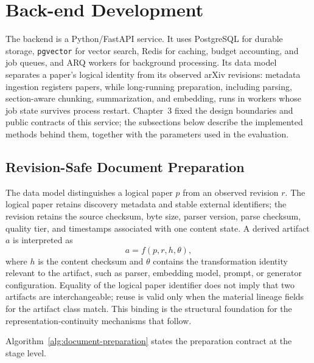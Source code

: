 \FloatBarrier

\section{Back-end Development}

The backend is a Python/FastAPI service.
It uses PostgreSQL for durable storage, \texttt{pgvector} for vector search, Redis for caching, budget accounting, and job queues, and ARQ workers for background processing.
Its data model separates a paper's logical identity from its observed arXiv revisions: metadata ingestion registers papers, while long-running preparation, including parsing, section-aware chunking, summarization, and embedding, runs in workers whose job state survives process restart.
Chapter~3 fixed the design boundaries and public contracts of this service; the subsections below describe the implemented methods behind them, together with the parameters used in the evaluation.

\subsection{Revision-Safe Document Preparation}
\label{subsec:backend-preparation}

The data model distinguishes a logical paper \(p\) from an observed revision \(r\). The logical paper retains discovery metadata and stable external identifiers; the revision retains the source checksum, byte size, parser version, parse checksum, quality tier, and timestamps associated with one content state. A derived artifact \(a\) is interpreted as
\begin{equation}
  a = f\!\left(p,r,h,\theta\right),
  \label{eq:artifact-lineage}
\end{equation}
where \(h\) is the content checksum and \(\theta\) contains the transformation identity relevant to the artifact, such as parser, embedding model, prompt, or generator configuration. Equality of the logical paper identifier does not imply that two artifacts are interchangeable; reuse is valid only when the material lineage fields for the artifact class match. This binding is the structural foundation for the representation-continuity mechanisms that follow.

Algorithm~\ref{alg:document-preparation} states the preparation contract at the stage level.

